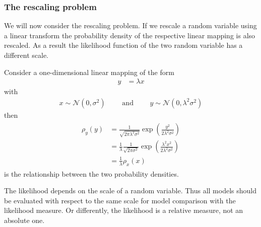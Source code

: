 \subsubsection{The rescaling problem}
We will now consider the rescaling problem. If we rescale a random variable using a linear transform
the probability density of the respective linear mapping is also rescaled. As a result the likelihood
function of the two random variable has a different scale.
\begin{example} \label{ex:rescaling}
Consider a one-dimensional linear mapping of the form
\begin{align}
	y &= \lambda x
\end{align}
with 
\begin{align*}
	x \sim \mathcal{N}(0,\sigma^2) \qquad \text{ and } \qquad
	y \sim \mathcal{N}(0,\lambda^2 \sigma^2)
\end{align*}
then
\begin{align}
	\begin{split}
	\rho_y(y) &= \frac{1}{\sqrt{2\pi \lambda^2 \sigma^2}} \exp \left( \frac{y^2}{2 \lambda^2 \sigma^2} \right)\\
	         &= \frac{1}{\lambda} \frac{1}{\sqrt{2\pi \sigma^2}} \exp \left( \frac{\lambda^2 x^2}{2 \lambda^2 \sigma^2} \right)\\
	         &= \frac{1}{\lambda} \rho_x(x)
	\end{split}	         
\end{align}
is the relationship between the two probability densities.
\end{example}
\noindent The likelihood depends on the scale of a random variable. Thus all models should be evaluated with
respect to the same scale for model comparison with the likelihood measure. Or differently, the likelihood is
a relative measure, not an absolute one.

